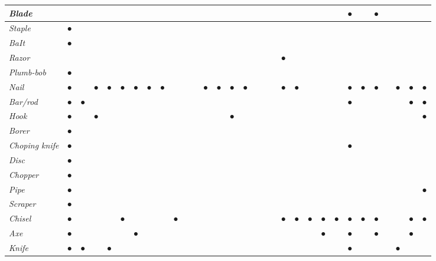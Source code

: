 \begin{longtable}{|l|l|l|l|l|l|l|l|l|l|l|l|l|l|l|l|l|l|l|l|l|l|l|l|l|l|l|l|l|l|l|}
\textit{Blade} &  &  &  &  &  &  &  &  &  &  &  &  &  &  &  &  &  &  &  &  &  &  &  & ● &  & ● &  &  &  &  \\
\hline
\textit{Staple} & ● &  &  &  &  &  &  &  &  &  &  &  &  &  &  &  &  &  &  &  &  &  &  &  &  &  &  &  &  &  \\
\hline
\textit{BaIt} & ● &  &  &  &  &  &  &  &  &  &  &  &  &  &  &  &  &  &  &  &  &  &  &  &  &  &  &  &  &  \\
\hline
\textit{Razor} &  &  &  &  &  &  &  &  &  &  &  &  &  &  &  &  &  &  & ● &  &  &  &  &  &  &  &  &  &  &  \\
\hline
\textit{Plumb-bob} & ● &  &  &  &  &  &  &  &  &  &  &  &  &  &  &  &  &  &  &  &  &  &  &  &  &  &  &  &  &  \\
\hline
\textit{Nail} & ● &  & ● & ● & ● & ● & ● & ● &  &  &  & ● & ● & ● & ● &  &  &  & ● & ● &  &  &  & ● & ● & ● &  & ● & ● & ● \\
\hline
\textit{Bar/rod} & ● & ● &  &  &  &  &  &  &  &  &  &  &  &  &  &  &  &  &  &  &  &  &  & ● &  &  &  &  & ● & ● \\
\hline
\textit{Hook} & ● &  & ● &  &  &  &  &  &  &  &  &  &  & ● &  &  &  &  &  &  &  &  &  &  &  &  &  &  &  & ● \\
\hline
\textit{Borer} & ● &  &  &  &  &  &  &  &  &  &  &  &  &  &  &  &  &  &  &  &  &  &  &  &  &  &  &  &  &  \\
\hline
\textit{Choping knife} & ● &  &  &  &  &  &  &  &  &  &  &  &  &  &  &  &  &  &  &  &  &  &  & ● &  &  &  &  &  &  \\
\hline
\textit{Disc} & ● &  &  &  &  &  &  &  &  &  &  &  &  &  &  &  &  &  &  &  &  &  &  &  &  &  &  &  &  &  \\
\hline
\textit{Chopper} & ● &  &  &  &  &  &  &  &  &  &  &  &  &  &  &  &  &  &  &  &  &  &  &  &  &  &  &  &  &  \\
\hline
\textit{Pipe} & ● &  &  &  &  &  &  &  &  &  &  &  &  &  &  &  &  &  &  &  &  &  &  &  &  &  &  &  &  & ● \\
\hline
\textit{Scraper} & ● &  &  &  &  &  &  &  &  &  &  &  &  &  &  &  &  &  &  &  &  &  &  &  &  &  &  &  &  &  \\
\hline
\textit{Chisel} & ● &  &  &  & ● &  &  &  & ● &  &  &  &  &  &  &  &  &  & ● & ● & ● & ● & ● & ● & ● & ● &  &  & ● & ● \\
\hline
\textit{Axe} & ● &  &  &  &  & ● &  &  &  &  &  &  &  &  &  &  &  &  &  &  &  & ● &  & ● &  & ● &  &  & ● &  \\
\hline
\textit{Knife} & ● & ● &  & ● &  &  &  &  &  &  &  &  &  &  &  &  &  &  &  &  &  &  &  & ● &  &  &  & ● &  &  \\

\end{longtable}
